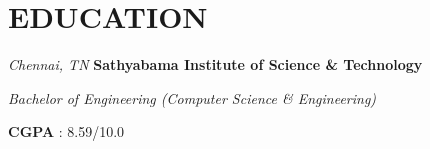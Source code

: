 \section{EDUCATION}
\begin{twocolentry}{
    \textit{Chennai, TN}}
    \textbf{Sathyabama Institute of Science \& Technology}

    \textit{Bachelor of Engineering \small{(Computer Science \& Engineering)}}
\end{twocolentry}
    
\vspace{0.05 cm}

\begin{onecolentry}
    \textbf{CGPA} : 8.59/10.0
\end{onecolentry}




